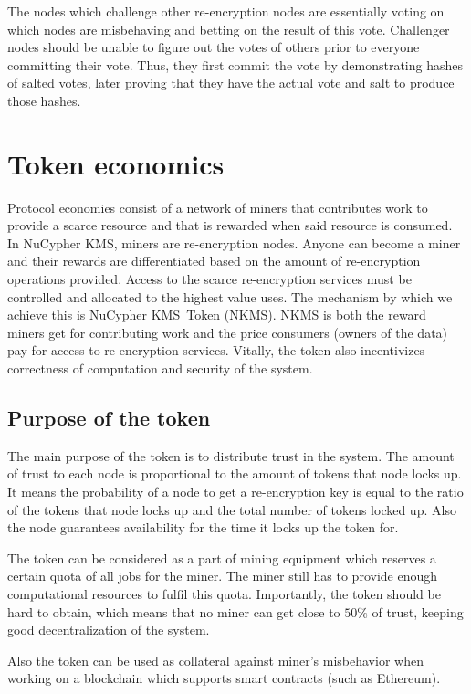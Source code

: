 \documentclass[longbibliography,nofootinbib]{revtex4-1}
\newcommand{\kms}{NuCypher KMS}
\begin{document}
The nodes which challenge other re-encryption nodes are essentially voting on which nodes are misbehaving and betting on the result of this vote.
Challenger nodes should be unable to figure out the votes of others prior to everyone committing their vote.
Thus, they first commit the vote by demonstrating hashes of salted votes, later proving that they have the actual vote and salt to produce those hashes.

\section{Token economics}
\label{sec:token}

Protocol economies consist of a network of miners that contributes work to provide a scarce resource and that is
rewarded when said resource is consumed.
In \kms, miners are re-encryption nodes.
Anyone can become a miner and their rewards are differentiated based on the amount of re-encryption operations provided.
Access to the scarce re-encryption services must be controlled and allocated to the highest value uses.
The mechanism by which we achieve this is \kms~Token (NKMS).
NKMS is both the reward miners get for contributing work and the price consumers (owners of the data) pay for access to re-encryption services.
Vitally, the token also incentivizes correctness of computation and security of the system.

\subsection{Purpose of the token}

The main purpose of the token is to distribute trust in the system.
The amount of trust to each node is proportional to the amount of tokens that node locks up.
It means the probability of a node to get a re-encryption key is equal to the ratio of the tokens that node locks up and the total number of tokens locked up.
Also the node guarantees availability for the time it locks up the token for.

The token can be considered as a part of mining equipment which reserves a certain quota of all jobs for the miner.
The miner still has to provide enough computational resources to fulfil this quota.
Importantly, the token should be hard to obtain, which means that no miner can get close to $50\%$ of trust, keeping good decentralization of the system.

Also the token can be used as collateral against miner's misbehavior when working on a blockchain which supports smart contracts (such as Ethereum).
\end{document}
